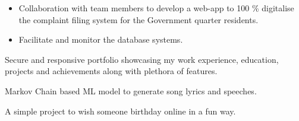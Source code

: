 \documentclass[10pt,a4paper,ragged2e]{altacv}
\begin{document}
    


\begin{itemize}
\item {Collaboration with team members to develop a web-app to 100 \% digitalise the complaint filing system for the Government quarter residents. }
\item {Facilitate and monitor the database systems.}

\end{itemize}
    







{ Secure and responsive portfolio showcasing my work experience, education, projects and achievements along with plethora of features. }



    {Markov Chain based ML model to generate song lyrics and speeches. }




 {A simple project to wish someone birthday online in a fun way.}


\end{document}
